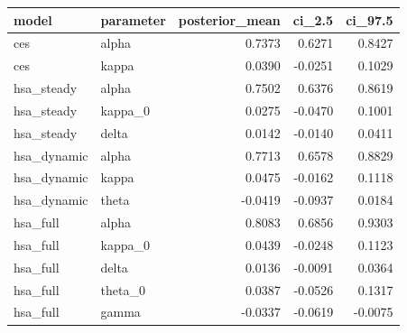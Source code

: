 \begin{tabular}{llrrr}
\toprule
model & parameter & posterior\_mean & ci\_2.5 & ci\_97.5 \\
\midrule
ces & alpha & 0.7373 & 0.6271 & 0.8427 \\
ces & kappa & 0.0390 & -0.0251 & 0.1029 \\
hsa\_steady & alpha & 0.7502 & 0.6376 & 0.8619 \\
hsa\_steady & kappa\_0 & 0.0275 & -0.0470 & 0.1001 \\
hsa\_steady & delta & 0.0142 & -0.0140 & 0.0411 \\
hsa\_dynamic & alpha & 0.7713 & 0.6578 & 0.8829 \\
hsa\_dynamic & kappa & 0.0475 & -0.0162 & 0.1118 \\
hsa\_dynamic & theta & -0.0419 & -0.0937 & 0.0184 \\
hsa\_full & alpha & 0.8083 & 0.6856 & 0.9303 \\
hsa\_full & kappa\_0 & 0.0439 & -0.0248 & 0.1123 \\
hsa\_full & delta & 0.0136 & -0.0091 & 0.0364 \\
hsa\_full & theta\_0 & 0.0387 & -0.0526 & 0.1317 \\
hsa\_full & gamma & -0.0337 & -0.0619 & -0.0075 \\
\bottomrule
\end{tabular}

